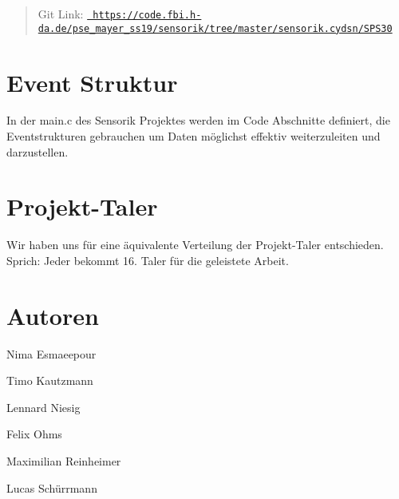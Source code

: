 \begin{DoxyCode}{0}
\DoxyCodeLine{\};}
\end{DoxyCode}
 \begin{quote}
Git Link\+: \href{https://code.fbi.h-da.de/pse_mayer_ss19/sensorik/tree/master/sensorik.cydsn/SPS30}{\texttt{ https\+://code.\+fbi.\+h-\/da.\+de/pse\+\_\+mayer\+\_\+ss19/sensorik/tree/master/sensorik.\+cydsn/\+S\+P\+S30}} \end{quote}
\hypertarget{index_autotoc_md9}{}\section{Event Struktur}\label{index_autotoc_md9}
In der main.\+c des Sensorik Projektes werden im Code Abschnitte definiert, die Eventstrukturen gebrauchen um Daten möglichst effektiv weiterzuleiten und darzustellen.\hypertarget{index_autotoc_md10}{}\section{Projekt-\/\+Taler}\label{index_autotoc_md10}
Wir haben uns für eine äquivalente Verteilung der Projekt-\/\+Taler entschieden. Sprich\+: Jeder bekommt 16. Taler für die geleistete Arbeit.\hypertarget{index_autotoc_md11}{}\section{Autoren}\label{index_autotoc_md11}
Nima Esmaeepour

Timo Kautzmann

Lennard Niesig

Felix Ohms

Maximilian Reinheimer

Lucas Schürrmann 